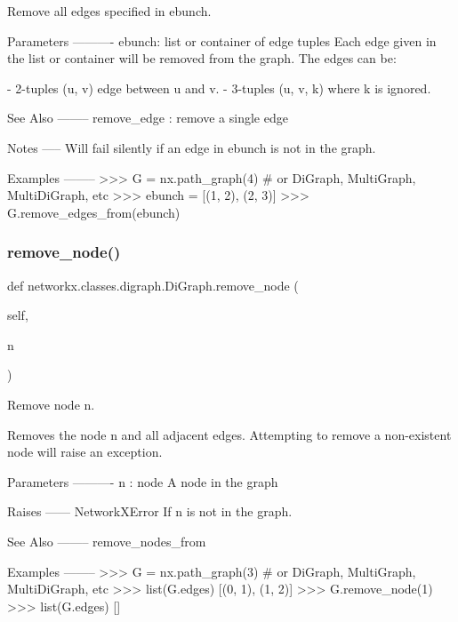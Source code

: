 \begin{DoxyVerb}Remove all edges specified in ebunch.

Parameters
----------
ebunch: list or container of edge tuples
    Each edge given in the list or container will be removed
    from the graph. The edges can be:

- 2-tuples (u, v) edge between u and v.
- 3-tuples (u, v, k) where k is ignored.

See Also
--------
remove_edge : remove a single edge

Notes
-----
Will fail silently if an edge in ebunch is not in the graph.

Examples
--------
>>> G = nx.path_graph(4)  # or DiGraph, MultiGraph, MultiDiGraph, etc
>>> ebunch = [(1, 2), (2, 3)]
>>> G.remove_edges_from(ebunch)
\end{DoxyVerb}
 \mbox{\label{classnetworkx_1_1classes_1_1digraph_1_1DiGraph_af725955087213a720569ba114a2ec413}} 
\subsubsection{\texorpdfstring{remove\+\_\+node()}{remove\_node()}}
{\footnotesize\ttfamily def networkx.\+classes.\+digraph.\+Di\+Graph.\+remove\+\_\+node (\begin{DoxyParamCaption}\item[{}]{self,  }\item[{}]{n }\end{DoxyParamCaption})}

\begin{DoxyVerb}Remove node n.

Removes the node n and all adjacent edges.
Attempting to remove a non-existent node will raise an exception.

Parameters
----------
n : node
   A node in the graph

Raises
------
NetworkXError
   If n is not in the graph.

See Also
--------
remove_nodes_from

Examples
--------
>>> G = nx.path_graph(3)  # or DiGraph, MultiGraph, MultiDiGraph, etc
>>> list(G.edges)
[(0, 1), (1, 2)]
>>> G.remove_node(1)
>>> list(G.edges)
[]\end{DoxyVerb}
 \mbox{\label{classnetworkx_1_1classes_1_1digraph_1_1DiGraph_a1f34bb3d0447c0064ca0d9a9a4e0d938}} 
